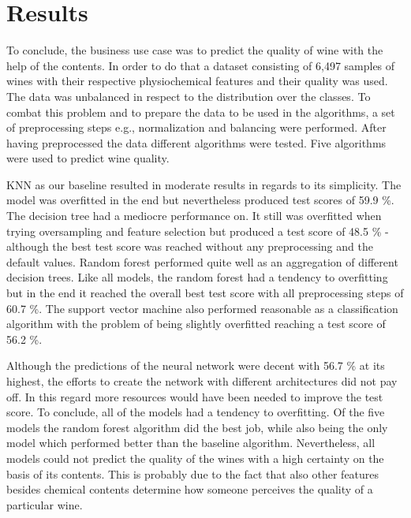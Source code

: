 \chapter{Results}
To conclude, the business use case was to predict the quality of wine with the help of the contents. In order to do that a dataset consisting of 6,497 samples of wines with their respective physiochemical features and their quality was used. The data was unbalanced in respect to the distribution over the classes. To combat this problem and to prepare the data to be used in the algorithms, a set of preprocessing steps e.g., normalization and balancing were performed. After having preprocessed the data different algorithms were tested. Five algorithms were used to predict wine quality. 

KNN as our baseline resulted in moderate results in regards to its simplicity. The model was overfitted in the end but nevertheless produced test scores of 59.9 \%. The decision tree had a mediocre performance on. It still was overfitted when trying oversampling and feature selection but produced a test score of 48.5 \% - although the best test score was reached without any preprocessing and the default values. Random forest performed quite well as an aggregation of different decision trees. Like all models, the random forest had a tendency to overfitting but in the end it reached the overall best test score with all preprocessing steps of 60.7 \%. The support vector machine also performed reasonable as a classification algorithm with the problem of being slightly overfitted reaching a test score of 56.2 \%.

Although the predictions of the neural network were decent with 56.7 \% at its highest, the efforts to create the network with different architectures did not pay off. In this regard more resources would have been needed to improve the test score. To conclude, all of the models had a tendency to overfitting.
Of the five models the random forest algorithm did the best job, while also being the only model which performed better than the baseline algorithm.
Nevertheless, all models could not predict the quality of the wines with a high certainty on the basis of its contents. This is probably due to the fact that also other features besides chemical contents determine how someone perceives the quality of a particular wine.